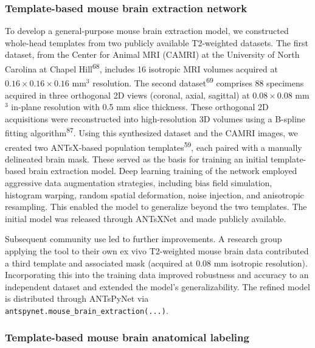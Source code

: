 \documentclass[
  12pt,
]{article}
\begin{document}
\subsubsection{Template-based mouse brain extraction
network}\label{template-based-mouse-brain-extraction-network}

To develop a general-purpose mouse brain extraction model, we
constructed whole-head templates from two publicly available T2-weighted
datasets. The first dataset, from the Center for Animal MRI (CAMRI) at
the University of North Carolina at Chapel Hill\textsuperscript{68},
includes 16 isotropic MRI volumes acquired at
\(0.16 \times 0.16 \times 0.16\) mm\(^3\) resolution. The second
dataset\textsuperscript{69} comprises 88 specimens acquired in three
orthogonal 2D views (coronal, axial, sagittal) at \(0.08 \times 0.08\)
mm\(^3\) in-plane resolution with 0.5 mm slice thickness. These
orthogonal 2D acquisitions were reconstructed into high-resolution 3D
volumes using a B-spline fitting algorithm\textsuperscript{87}. Using
this synthesized dataset and the CAMRI images, we created two
ANTsX-based population templates\textsuperscript{59}, each paired with a
manually delineated brain mask. These served as the basis for training
an initial template-based brain extraction model. Deep learning training
of the network employed aggressive data augmentation strategies,
including bias field simulation, histogram warping, random spatial
deformation, noise injection, and anisotropic resampling. This enabled
the model to generalize beyond the two templates. The initial model was
released through ANTsXNet and made publicly available.

Subsequent community use led to further improvements. A research group
applying the tool to their own ex vivo T2-weighted mouse brain data
contributed a third template and associated mask (acquired at 0.08 mm
isotropic resolution). Incorporating this into the training data
improved robustness and accuracy to an independent dataset and extended
the model's generalizability. The refined model is distributed through
ANTsPyNet via \texttt{antspynet.mouse\_brain\_extraction(...)}.

\subsubsection{Template-based mouse brain anatomical
labeling}\label{template-based-mouse-brain-anatomical-labeling}
\end{document}
